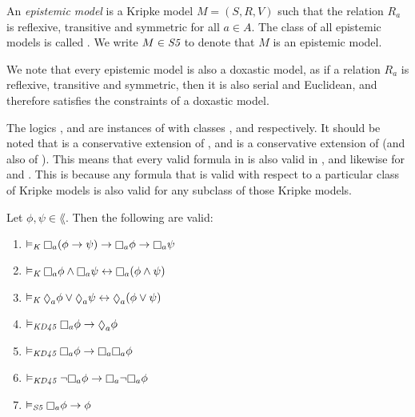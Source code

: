 \begin{definition}
An \textit{epistemic model} is a Kripke model $M = (S, R, V)$ such that the
relation $R_a$ is reflexive, transitive and symmetric for all $a \in A$. The
class of all epistemic models is called \classS{}. We write $M \in \textit{S5}{}$ to
denote that $M$ is an epistemic model.
\end{definition}

We note that every epistemic model is also a doxastic model, as if a relation
$R_a$ is reflexive, transitive and symmetric, then it is also serial and
Euclidean, and therefore satisfies the constraints of a doxastic model.

The logics \logicK{}, \logicKD{} and \logicS{} are instances of \logicC{} with
classes \classK{}, \classKD{} and \classS{} respectively. It should be noted
that \logicKD{} is a conservative extension of \logicK{}, and \logicS{} is a
conservative extension of \logicKD{} (and also of \logicK{}). This means that
every valid formula in \logicK{} is also valid in \logicKD{}, and likewise for
\logicKD{} and \logicS{}. This is because any formula that is valid with respect
to a particular class of Kripke models is also valid for any subclass of those
Kripke models.

\begin{proposition}\label{pre-properties}
Let $\phi, \psi \in \lang$. Then the following are valid:

\begin{enumerate}
\item\label{pre-property-k} $\entails_{\classK} \knows_a (\phi \implies \psi) \implies \knows_a \phi
\implies \knows_a \psi$
\item\label{pre-property-conj} $\entails_{\classK} \knows_a \phi \land \knows_a \psi \iff \knows_a (\phi \land \psi)$
\item $\entails_{\classK} \suspects_a \phi \lor \suspects_a \psi \iff \suspects_a (\phi
\lor \psi)$
\item\label{pre-property-d} $\entails_{\classKD} \knows_a \phi \implies \suspects_a \phi$
\item\label{pre-property-4} $\entails_{\classKD} \knows_a \phi \implies \knows_a \knows_a \phi$
\item\label{pre-property-5} $\entails_{\classKD} \neg\knows_a \phi \implies \knows_a \neg \knows_a \phi$
\item\label{pre-property-t} $\entails_{\classS} \knows_a \phi \implies \phi$
\end{enumerate}
\end{proposition}


